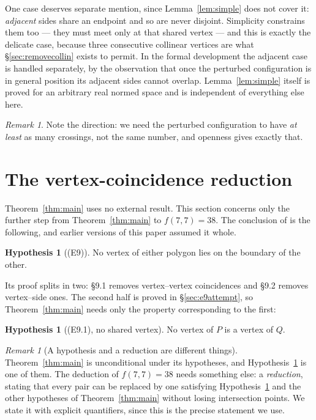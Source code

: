 \documentclass[11pt,a4paper]{article}
\theoremstyle{plain}
\theoremstyle{definition}
\newtheorem{hypothesis}[theorem]{Hypothesis}
\theoremstyle{remark}
\newtheorem{remark}[theorem]{Remark}
\begin{document}
One case deserves separate mention, since Lemma~\ref{lem:simple} does not cover
it: \emph{adjacent} sides share an endpoint and so are never disjoint.
Simplicity constrains them too --- they must meet only at that shared vertex ---
and this is exactly the delicate case, because three consecutive collinear
vertices are what \S\ref{sec:removecollin} exists to permit. In the formal
development the adjacent case is handled separately, by the observation that
once the perturbed configuration is in general position its adjacent sides
cannot overlap. Lemma~\ref{lem:simple} itself is proved for an arbitrary real
normed space and is independent of everything else here.

\begin{remark}
Note the direction: we need the perturbed configuration to have \emph{at least}
as many crossings, not the same number, and openness gives exactly that.
\end{remark}

\section{The vertex-coincidence reduction}\label{sec:import}

Theorem~\ref{thm:main} uses no external result. This section concerns only the
further step from Theorem~\ref{thm:main} to $f(7,7)=38$. The conclusion of
\cite[\S9]{AckermanKeszeghRote2022} is the following, and earlier versions of
this paper assumed it whole.

\begin{hypothesis}[\textsc{(E9)}]\label{hyp:e9}
No vertex of either polygon lies on the boundary of the other.
\end{hypothesis}

Its proof splits in two: \S9.1 removes vertex--vertex coincidences and \S9.2
removes vertex--side ones. The second half is proved in \S\ref{sec:e9attempt},
so Theorem~\ref{thm:main} needs only the property corresponding to the first:

\begin{hypothesis}[\textsc{(E9.1)}, no shared vertex]\label{hyp:e91}
No vertex of $P$ is a vertex of $Q$.
\end{hypothesis}

\begin{remark}[A hypothesis and a reduction are different things]
Theorem~\ref{thm:main} is unconditional under its hypotheses, and
Hypothesis~\ref{hyp:e91} is one of them. The deduction of $f(7,7)=38$ needs
something else: a \emph{reduction}, stating that every pair can be replaced by
one satisfying Hypothesis~\ref{hyp:e91} and the other hypotheses of
Theorem~\ref{thm:main} without losing intersection points. We state it with
explicit quantifiers, since this is the precise statement we use.
\end{remark}
\end{document}
